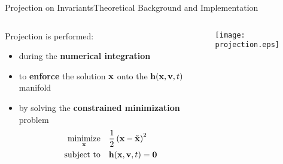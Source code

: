 \begin{frame}{Projection on Invariants}{Theoretical Background and Implementation}
  \vspace{-1.0em}
  \begin{columns}
    \begin{column}[c]{0.6\textwidth}
      Projection is performed:
      \begin{itemize}
        \item during the \textbf{numerical integration}
        \item to \textbf{enforce} the solution $\mathbf{x}$ onto the $\mathbf{h}(\mathbf{x}, \mathbf{v}, t)$ manifold
        \item by solving the \textbf{constrained minimization} problem
          \begin{align*}
            \underset{\mathbf{x}}{\text{minimize}} \quad &\dfrac{1}{2}\left(\mathbf{x} - \tilde{\mathbf{x}}\right)^2 \\
            \text{subject to} \quad &\mathbf{h}(\mathbf{x}, \mathbf{v}, t) = \mathbf{0}
          \end{align*}
        \end{itemize}
      \end{column}
      \begin{column}[c]{0.4\textwidth}
        \hspace{-0.2\textwidth}\texttt{[image: projection.eps]}
      \end{column}
    \end{columns}
    \vspace{1.0em}
\end{frame}

